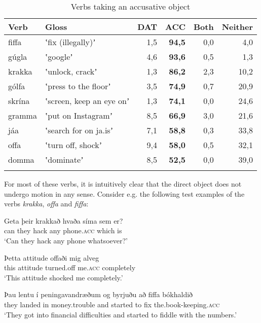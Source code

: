 \documentclass[output=paper,modfonts,nonflat,colorlinks,citecolor=brown]{langsci/langscibook}
\begin{document}
\begin{table}
{\caption{\label{tab:jonsson:3}Verbs taking an accusative object} }
\begin{tabularx}{\textwidth}{Xlrrrr} 
\lsptoprule
Verb & Gloss & DAT & \textbf{ACC} & Both & Neither\\
\midrule 
fiffa & ʽfix (illegally)ʼ & 1,5 & \textbf{94,5} & 0,0 & 4,0\\
gúgla & ʽgoogleʼ & 4,6 & \textbf{93,6} & 0,5 & 1,3\\
krakka & ʽunlock, crackʼ & 1,3 & \textbf{86,2} & 2,3 & 10,2\\
gólfa & ʽpress to the floorʼ & 3,5 & \textbf{74,9} & 0,7 & 20,9\\
skrína & ʽscreen, keep an eye onʼ & 1,3 & \textbf{74,1} & 0,0 & 24,6\\
gramma & ʽput on Instagramʼ & 8,5 & \textbf{66,9} & 3,0 & 21,6\\
jáa & ʽsearch for on ja.isʼ & 7,1 & \textbf{58,8} & 0,3 & 33,8\\
offa & ʽturn off, shockʼ & 9,4 & \textbf{58,0} & 0,5 & 32,1\\
domma & ʽdominateʼ & 8,5 & \textbf{52,5} & 0,0 & 39,0\\
\lspbottomrule
\end{tabularx}
\end{table}

For most of these verbs, it is intuitively clear that the direct object does not undergo motion in any sense. Consider e.g. the following test examples of the verbs \textit{krakka}, \textit{offa} and \textit{fiffa}:

 
\ea%
    \label{ex:jonsson:5} 
\ea
\gll  Geta  þeir  krakkað  hvaða  síma  sem  er?\\
   can  they  hack  any  phone.\textsc{acc}  which  is\\
\glt `Can they hack any phone whatsoever?'
 
\ex
\gll   Þetta  attitude  offaði  mig   alveg\\
 this  attitude  turned.off  me.\textsc{acc}   completely\\
   \glt`This attitude shocked me completely.'
 

\ex
\gll   Þau  lentu  í  peningavandræðum  og  byrjuðu  að  fiffa  bókhaldið\\
 they  landed  in  money.trouble  and  started  to  fix  the.book-keeping.\textsc{acc}\\
\glt `They got into financial difficulties and started to fiddle with the numbers.'
\z
\z
\end{document}
